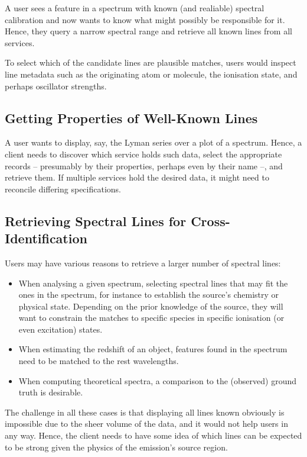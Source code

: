 \documentclass[11pt,a4paper]{ivoa}
\begin{document}
A user sees a feature in a spectrum with known (and realiable) spectral
calibration and now wants to know what might possibly be responsible for
it.  Hence, they query a narrow spectral range and retrieve all known
lines from all services.

To select which of the candidate lines are plausible matches, users
would inspect line metadata such as the originating atom or molecule, the
ionisation state, and perhaps oscillator strengths.

\subsection{Getting Properties of Well-Known Lines}

A user wants to display, say, the Lyman series over a plot of a
spectrum.  Hence, a client needs to discover which service holds such
data, select the appropriate records -- presumably by their properties,
perhaps even by their name --, and retrieve them.  If multiple services
hold the desired data, it might need to reconcile differing
specifications.


\subsection{Retrieving Spectral Lines for Cross-Identification}

Users may have various reasons to retrieve a larger number of spectral
lines:

\begin{itemize}
\item When analysing a given spectrum, selecting spectral lines that may
fit the ones in the spectrum, for instance to establish the source's
chemistry or physical state.  Depending on the prior knowledge of the
source, they will want to constrain the matches to specific species in
specific ionisation (or even excitation) states.

\item When estimating the redshift of an object, features found in the
spectrum need to be matched to the rest wavelengths.

\item When computing theoretical spectra, a comparison to the (observed)
ground truth is desirable.
\end{itemize}

The challenge in all these cases is that displaying all lines
known obviously is impossible due to the sheer volume of the data,
and it would not help users in any way.
Hence, the client needs to have some idea of which lines can be expected
to be strong given the physics of the emission's source region.
\end{document}
